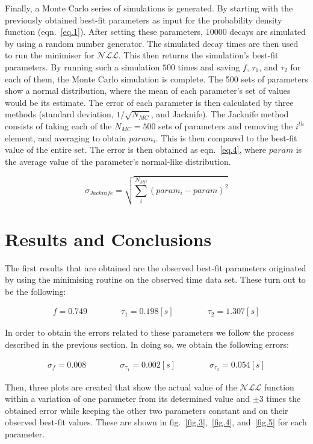\documentclass[a4paper,12pt]{article}
\begin{document}
Finally, a Monte Carlo series of simulations is generated. By starting with the previously obtained best-fit parameters as input for the probability density function (eqn.~\ref{eq.1}). After setting these parameters, $10000$ decays are simulated by using a random number generator. The simulated decay times are then used to run the minimiser for $\mathcal{NLL}$. This then returns the simulation's best-fit parameters. By running such a simulation $500$ times and saving $f$, $\tau_1$, and $\tau_2$ for each of them, the Monte Carlo simulation is complete. The 500 sets of parameters show a normal distribution, where the mean of each parameter's set of values would be its estimate. The error of each parameter is then calculated by three methods (standard deviation, $1/\sqrt{N_{MC}}$, and Jacknife). The Jacknife method consists of taking each of the $N_{MC}=500$ sets of parameters and removing the $i^{th}$ element, and averaging to obtain $param_i$. This is then compared to the best-fit value of the entire set. The error is then obtained as eqn.~\ref{eq.4}, where $param$ is the average value of the parameter's normal-like distribution. 

\begin{equation}
 \sigma_{Jacknife} = \sqrt{\sum_i^{N_{MC}} (param_i - param)^2}
 \label{eq.4}
\end{equation}

\section{Results and Conclusions}

The first results that are obtained are the observed best-fit parameters originated by using the minimising routine on the observed time data set. These turn out to be the following:

\begin{align}
 f = 0.749 \qquad \qquad \tau_1 = 0.198 [s] \qquad \qquad \tau_2 = 1.307 [s] \nonumber
\end{align}

In order to obtain the errors related to these parameters we follow the process described in the previous section. In doing so, we obtain the following errors:

\begin{align}
 \sigma_f = 0.008 \qquad \qquad \sigma_{\tau_1} = 0.002 [s] \qquad \qquad \sigma_{\tau_2} = 0.054 [s] \nonumber
\end{align}

Then, three plots are created that show the actual value of the $\mathcal{NLL}$ function within a variation of one parameter from its determined value and $\pm3$ times the obtained error while keeping the other two parameters constant and on their observed best-fit values. These are shown in fig.~\ref{fig.3},~\ref{fig.4}, and~\ref{fig.5} for each parameter. 
\end{document}
